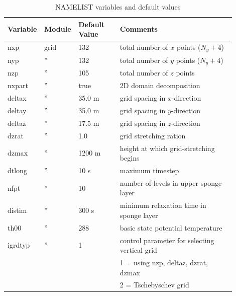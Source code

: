 \documentclass[11pt,a4paper]{article}
\begin{document}
\begin{longtable}[htb]{p{0.12\linewidth}p{0.1\linewidth}p{0.18\linewidth}p{0.5\linewidth}}
\caption{NAMELIST variables and default values}\\
\hline
\hline
Variable & Module & Default Value & Comments \\ 
\hline
\endhead
nxp          & grid & 132                 & total number of $x$ points ($N_y+4$)                  \\
nyp          &  ''  & 132                 & total number of $y$ points ($N_y+4$)                  \\
nzp          &  ''  & 105                 & total number of $z$ points                            \\
nxpart       &  ''  & true                & 2D domain decomposition                               \\
deltax       &  ''  & 35.0 m              & grid spacing in $x$-direction                         \\
deltay       &  ''  & 35.0 m              & grid spacing in $y$-direction                         \\
deltaz       &  ''  & 17.5 m              & grid spacing in $z$-direction                         \\
dzrat        &  ''  & 1.0                 & grid stretching ration                                \\
dzmax        &  ''  & 1200 m              & height at which grid-stretching begins                \\
dtlong       &  ''  & 10 s                & maximum timestep                                      \\
nfpt         &  ''  & 10                  & number of levels in upper sponge layer                \\
distim       &  ''  & 300 s               & minimum relaxation time in sponge layer               \\
th00         &  ''  & 288                 & basic state potential temperature                     \\
igrdtyp      &  ''  & 1                   & control parameter for selecting vertical grid         \\
             &      &                     & \hspace{2mm} 1 = using nzp, deltaz, dzrat, dzmax      \\
             &      &                     & \hspace{2mm} 2 = Tschebyschev grid                    \\

\end{longtable}
\end{document}
